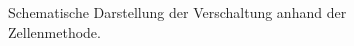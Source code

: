 \begin{figure}[htb]
\caption{Schematische Darstellung der Verschaltung anhand der Zellenmethode.}
\label{fig:Zellenmethode}
\end{figure}









